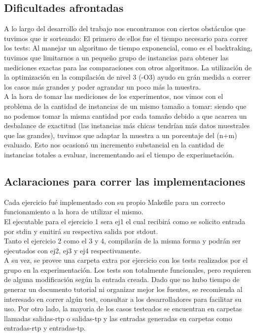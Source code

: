 \subsection{Dificultades afrontadas}

A lo largo del desarrollo del trabajo nos encontramos con ciertos obstáculos que tuvimos que ir sorteando:
El primero de ellos fue el tiempo necesario para correr los tests: Al manejar un algoritmo de tiempo exponencial, como es el backtraking, tuvimos que limitarnos a un pequeño grupo de instancias para obtener las mediciones exactas para las comparaciones con otros algoritmos. La utilización de la optimización en la compilación de nivel 3 (-O3) ayudo en grán medida a correr los casos más grandes y poder agrandar un poco más la muestra.\\
A la hora de tomar las mediciones de los experimentos, nos vimos con el problema de la cantidad de instancias de un mismo tamaño a tomar: siendo que no podemos tomar la misma cantidad por cada tamaño debido a que acarrea un desbalance de exactitud (las instancias más chicas tendrían más datos muestrales que las grandes), tuvimos que adaptar la muestra a un porcentaje del (n+m) evaluado. Esto nos ocasionó un incremento substancial en la cantidad de instancias totales a evaluar, incrementando asi el tiempo de experimetación.\\

\subsection{Aclaraciones para correr las implementaciones}

Cada ejercicio fué implementado con su propio Makefile para un correcto funcionamiento a la hora de utilizar el mismo.\\
El ejecutable para el ejercicio 1 sera ej1 el cual recibir\'a como se solicito entrada por stdin y emitir\'a su respectiva salida por stdout.\\
Tanto el ejercicio 2 como el 3 y 4, compilar\'an de la misma forma y podr\'an ser ejecutados con ej2, ej3 y ej4 respectivamente.\\
A su vez, se provee una carpeta extra por ejercicio con los tests realizados por el grupo en la experimentación. Los tests son totalmente funcionales, pero requieren de alguna modificación según la entrada creada. Dado que no hubo tiempo de generar un documento tutorial ni organizar mejor los fuentes, se recomienda al interesado en correr algún test, consultar a los desarrolladores para facilitar su uso.
Por otro lado, la mayoria de los casos testeados se encuentran en carpetas llamadas salidas-rtp o salidas-tp y las entradas generadas en carpetas como entradas-rtp y entradas-tp.